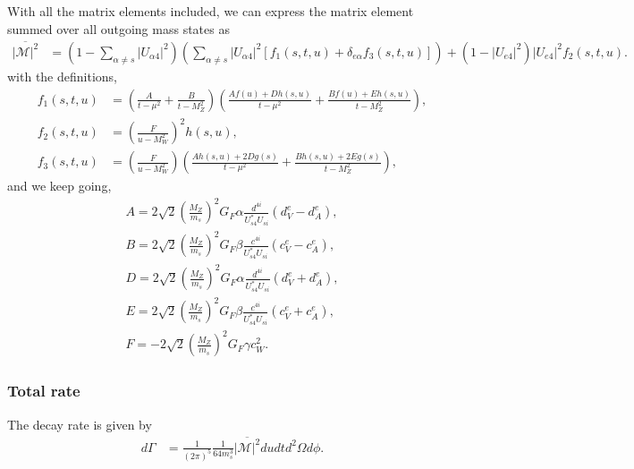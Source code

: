 \documentclass[11pt, a4paper]{article}
\begin{document}
With all the matrix elements included, we can express the matrix element summed over all outgoing mass states as 
%
\begin{align*} 
%
\overline{\left|\mathcal{M}\right|^2} &= \left(1-\sum_{\alpha\neq s}|U_{\alpha 4}|^2\right)\left( \sum_{\alpha\neq s}|U_{\alpha 4}|^2\left[f_1(s,t,u)+\delta_{e\alpha}f_3(s,t,u)\right]\right) + \left(1-|U_{e 4}|^2\right)|U_{e 4}|^2f_2(s,t,u).
%
\end{align*}
%
with the definitions,
%
\begin{align*}  
%
f_1(s,t,u) &= \left( \frac{A}{t-\mu^2} + \frac{B}{t-M_Z^2}\right)\left(\frac{Af(u) + Dh(s,u)}{t-\mu^2} + \frac{Bf(u)+Eh(s,u)}{t-M_Z^2}\right),\\
%
f_2(s,t,u) &= \left( \frac{F}{u-M_W^2} \right)^2h(s,u),\\
%
f_3(s,t,u) &= \left( \frac{F}{u-M_W^2} \right)\left(\frac{Ah(s,u) + 2Dg(s)}{t-\mu^2} + \frac{Bh(s,u)+2Eg(s)}{t-M_Z^2}\right),
%
\end{align*}
%
and we keep going,
%
\begin{align*}  
%
A = 2\sqrt{2}\left(\frac{M_Z}{m_s}\right)^2G_F\alpha \frac{d^{4i}}{U^*_{s4}U_{si}}(d^e_V-d^e_A), \\
B = 2\sqrt{2}\left(\frac{M_Z}{m_s}\right)^2G_F\beta \frac{c^{4i}}{U^*_{s4}U_{si}}(c^e_V-c^e_A), \\
D = 2\sqrt{2}\left(\frac{M_Z}{m_s}\right)^2G_F\alpha\frac{d^{4i}}{U^*_{s4}U_{si}}(d^e_V+d^e_A), \\
E = 2\sqrt{2}\left(\frac{M_Z}{m_s}\right)^2G_F\beta \frac{c^{4i}}{U^*_{s4}U_{si}}(c^e_V+c^e_A), \\
F = - 2\sqrt{2}\left(\frac{M_Z}{m_s}\right)^2G_F\gamma c_W^2. 
%
\end{align*}


\subsubsection{Total rate}

The decay rate is given by
%
\begin{align*} 
%
d\Gamma &= \frac{1}{(2\pi)^5}\frac{1}{64m^3_s}\overline{\left|\mathcal{M}\right|^2}
du dt d^2\Omega d\phi.
%
\end{align*}
\end{document}
